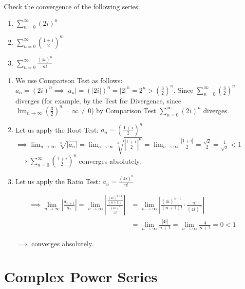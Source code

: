 \begin{example}\label{example:13.2} Check the convergence of the following series:
    \begin{enumerate}
        \item  $\sum_{n=0}^{\infty} (2i)^n$ 
        \item  $\sum_{n=0}^{\infty} \left(\frac{1+i}{2}\right)^n$ 
        \item  $\sum_{n=0}^{\infty} \frac{(4i)^n}{n!}$
    \end{enumerate}
\begin{soln}
    \begin{enumerate}
        \item We use Comparison Test as follows: $a_n = (2i)^n \implies |a_n| = (|2i|)^n = |2|^n = 2^n > (\frac{3}{2})^n$. Since $\sum_{n=0}^{\infty} (\frac{3}{2})^n$ diverges (for example, by the Test for Divergence, since $\lim_{n \to \infty} (\frac{3}{2})^n = \infty \neq 0$) by Comparison Test $\sum_{n=0}^{\infty} (2i)^n$ diverges.
    
        \item Let us apply the Root Test: $a_n = \left(\frac{1+i}{2}\right)^n$
    $\implies \lim_{n \to \infty} \sqrt[n]{|a_n|} = \lim_{n \to \infty} \sqrt[n]{\left|\frac{1+i}{2}\right|^n} = \lim_{n \to \infty} \frac{|1+i|}{2} = \frac{\sqrt{2}}{2} = \frac{1}{\sqrt{2}} < 1$
    $\implies \sum_{n=0}^{\infty} \left(\frac{1+i}{2}\right)^n$ converges absolutely.
    
    \item Let us apply the Ratio Test: $a_n = \frac{(4i)^n}{n!}$
    
    \begin{align*}
         \implies \lim_{n \to \infty} \left| \frac{a_{n+1}}{a_n} \right| = \lim_{n \to \infty} \left| \frac{\frac{(4i)^{n+1}}{(n+1)!}}{\frac{(4i)^n}{n!}} \right| &= \lim_{n \to \infty} \left| \frac{(4i)^{n+1}}{(n+1)!} \cdot \frac{n!}{(4i)^n} \right| \\
         & = \lim_{n \to \infty} \frac{|4i|}{n+1} = \lim_{n \to \infty} \frac{4}{n+1} = 0 < 1 
    \end{align*}
    
    $\implies $ converges absolutely.
    \end{enumerate}
\end{soln}
\end{example}

\section{Complex Power Series}

